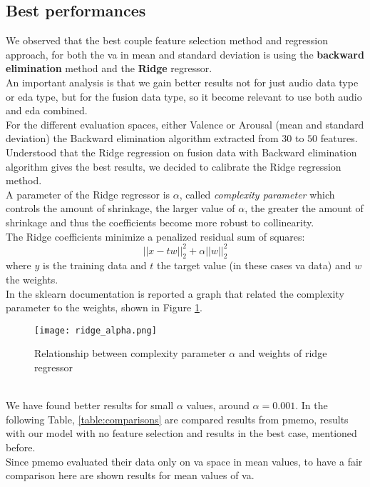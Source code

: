 \subsection{Best performances}
We observed that the best couple feature selection method and regression approach, for both the \gls{va} in mean and standard deviation is using the \textbf{backward elimination} method and the \textbf{Ridge} regressor.
\\ \indent
An important analysis is that we gain better results not for just audio data type or \gls{eda} type, but for the fusion data type, so it become relevant to use both audio and \gls{eda} combined.
\\ \indent
For the different evaluation spaces, either Valence or Arousal (mean and standard deviation) the Backward elimination algorithm extracted from $30$ to $50$ features.
\\
Understood that the Ridge regression on fusion data with Backward elimination algorithm gives the best results, we decided to calibrate the Ridge regression method.
\\
A parameter of the Ridge regressor is $\alpha$, called \textit{complexity parameter} which controls the amount of shrinkage, the larger value of $\alpha$, the greater the amount of shrinkage and thus the coefficients become more robust to collinearity.
\\
The Ridge coefficients minimize a penalized residual sum of squares:
\begin{equation}
	||x-tw||^2_2+\alpha ||w||^2_2
\end{equation}
where $y$ is the training data and $t$ the target value (in these cases \gls{va} data) and $w$ the weights.
\\
In the sklearn documentation is reported a graph that related the complexity parameter to the weights, shown in Figure \ref{fig:ridge_alpha}.
\begin{figure}[h]
    \centering
    \texttt{[image: ridge\_alpha.png]} 
	\caption{Relationship between complexity parameter $\alpha$ and weights of ridge regressor}
    \label{fig:ridge_alpha}
\end{figure}
\\
We have found better results for small $\alpha$ values, around $\alpha=0.001$.
In the following Table, \ref{table:comparisons} are compared results from \gls{pmemo}, results with our model with no feature selection and results in the best case, mentioned before.
\\
Since \gls{pmemo} evaluated their data only on \gls{va} space in mean values, to have a fair comparison here are shown results for mean values of \gls{va}.
